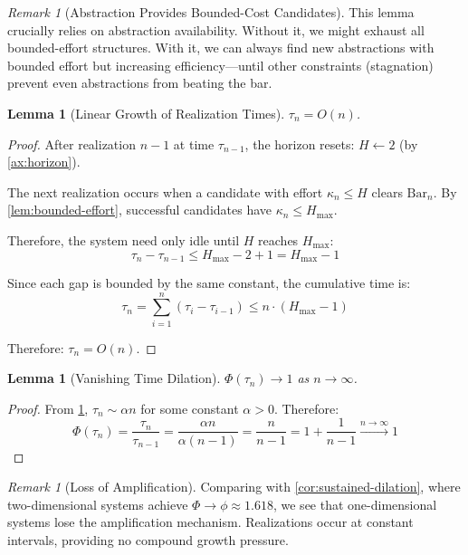 \documentclass[11pt]{article}
\newtheorem{lemma}[theorem]{Lemma}
\theoremstyle{definition}
\theoremstyle{remark}
\newtheorem{remark}[theorem]{Remark}
\begin{document}
\begin{remark}[Abstraction Provides Bounded-Cost Candidates]
This lemma crucially relies on abstraction availability. Without it, we might exhaust all bounded-effort structures. With it, we can always find new abstractions with bounded effort but increasing efficiency---until other constraints (stagnation) prevent even abstractions from beating the bar.
\end{remark}

\begin{lemma}[Linear Growth of Realization Times]
\label{lem:linear-times}
$\tau_n = O(n)$.
\end{lemma}

\begin{proof}
After realization $n-1$ at time $\tau_{n-1}$, the horizon resets: $H \leftarrow 2$ (by \cref{ax:horizon}).

The next realization occurs when a candidate with effort $\kappa_n \leq H$ clears $\mathrm{Bar}_n$. By \cref{lem:bounded-effort}, successful candidates have $\kappa_n \leq H_{\max}$.

Therefore, the system need only idle until $H$ reaches $H_{\max}$:
\[
\tau_n - \tau_{n-1} \leq H_{\max} - 2 + 1 = H_{\max} - 1
\]

Since each gap is bounded by the same constant, the cumulative time is:
\[
\tau_n = \sum_{i=1}^{n} (\tau_i - \tau_{i-1}) \leq n \cdot (H_{\max} - 1)
\]

Therefore: $\tau_n = O(n)$.
\end{proof}

\begin{lemma}[Vanishing Time Dilation]
\label{lem:vanishing-dilation}
$\Phi(\tau_n) \to 1$ as $n \to \infty$.
\end{lemma}

\begin{proof}
From \cref{lem:linear-times}, $\tau_n \sim \alpha n$ for some constant $\alpha > 0$. Therefore:
\[
\Phi(\tau_n) = \frac{\tau_n}{\tau_{n-1}} = \frac{\alpha n}{\alpha(n-1)} = \frac{n}{n-1} = 1 + \frac{1}{n-1} \xrightarrow{n \to \infty} 1
\]
\end{proof}

\begin{remark}[Loss of Amplification]
Comparing with \cref{cor:sustained-dilation}, where two-dimensional systems achieve $\Phi \to \phi \approx 1.618$, we see that one-dimensional systems lose the amplification mechanism. Realizations occur at constant intervals, providing no compound growth pressure.
\end{remark}
\end{document}
